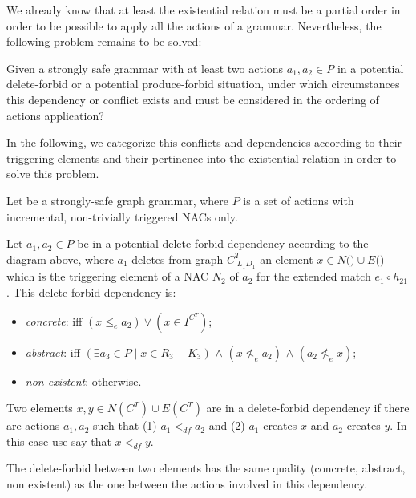 We already know that at least the existential relation must be a partial order in order to be possible to apply all the actions of a grammar. Nevertheless, the following problem remains to be solved:

\begin{intuition}
  Given a strongly safe grammar \doublyTypedGraphGrammarCore{} with at least two actions $a_1, a_2 \in P$ in a potential delete-forbid or a potential produce-forbid situation, under which circumstances this dependency or conflict exists and must be considered in the ordering of actions application?
\end{intuition}

In the following, we categorize this conflicts and dependencies according to their triggering elements and their pertinence into the existential relation in order to solve this problem.

\begin{definition}\label{def:delete-forbid-strong} Let \doublyTypedGraphGrammarCore{} be a strongly-safe graph grammar, where $P$ is a set of actions with incremental, non-trivially triggered NACs only.

\hfill

  Let $a_1, a_2 \in P$ be in a potential delete-forbid dependency according to the diagram above, where $a_1$ deletes from graph $C^T_{|L_1D_1}$ an element $x \in N($\coreGraph$) \cup E($\coreGraph$)$ which is the triggering element of a NAC $N_2$ of $a_2$ for the extended match $e_1 \circ h_{21}$. This delete-forbid dependency is:

\begin{itemize}
  \item \emph{concrete}: iff $(x \leq_e a_2) \lor (x \in I^{C^T})$;
  \item \emph{abstract}: iff $(\exists a_3 \in P \mid x \in R_3 - K_3)$ $\land$ $(x \not\leq_e a_2)$ $\land$ $(a_2 \not\leq_e x)$;%
  \item \emph{non existent}: otherwise.
\end{itemize}

  Two elements $x, y \in N(C^T) \cup E(C^T)$ are in a delete-forbid dependency if there are actions $a_1,a_2$ such that (1) $a_1 <_{df} a_2$ and (2) $a_1$ creates $x$ and $a_2$ creates $y$. In this case use say that $x <_{df} y$.

  The delete-forbid between two elements has the same quality (concrete, abstract, non existent) as the one between the actions involved in this dependency.
\end{definition}

